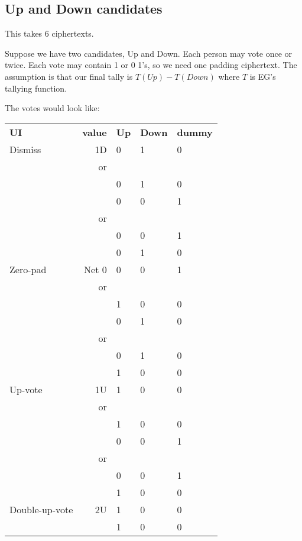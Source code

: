 \documentclass[10pt,a4paper]{article}
\begin{document}
\subsection{Up and Down candidates}
This takes 6 ciphertexts.

Suppose we have two candidates, Up and Down. Each person may vote once or twice. Each vote may contain 1 or 0 1's, so we need one padding ciphertext. The assumption is that our final tally is $T(\textit{Up}) - T(\textit{Down})$ where $T$ is EG's tallying function.

The votes would look like:

\begin{tabular}{lrlll}
	{\bf UI}  & {\bf value }&{\bf  Up}&{\bf  Down} &{\bf  dummy }\\
	Dismiss   & 1D          & 0          & 1    & 0\\
	& or  & & & \\		  
	&            & 0          & 1   & 0 \\ 
	&            & 0          & 0   & 1    \\ 
	& or  & & & \\		  
&            & 0          & 0   & 1    \\ 
&            & 0          & 1   & 0 \\  \hline
	Zero-pad	 & Net 0          & 0          & 0   & 1 \\
	& or  & & & \\
	&            & 1          & 0   & 0  \\
	&            & 0          & 1   & 0 \\   
	& or  & & & \\	
    &            & 0          & 1   & 0 \\
	&            & 1          & 0   & 0  \\ \hline
	
	Up-vote   & 1U          & 1          & 0   & 0 \\
	& or  & & & \\
	&            & 1          & 0  & 0  \\
	&            & 0          & 0 & 1    \\   
	& or  & & & \\
&            & 0          & 0 & 1    \\  
&            & 1          & 0  & 0  \\ \hline
	Double-up-vote & 2U          & 1          & 0  & 0  \\ 
	&            & 1          & 0  & 0  \\     \hline
\end{tabular}
\end{document}
